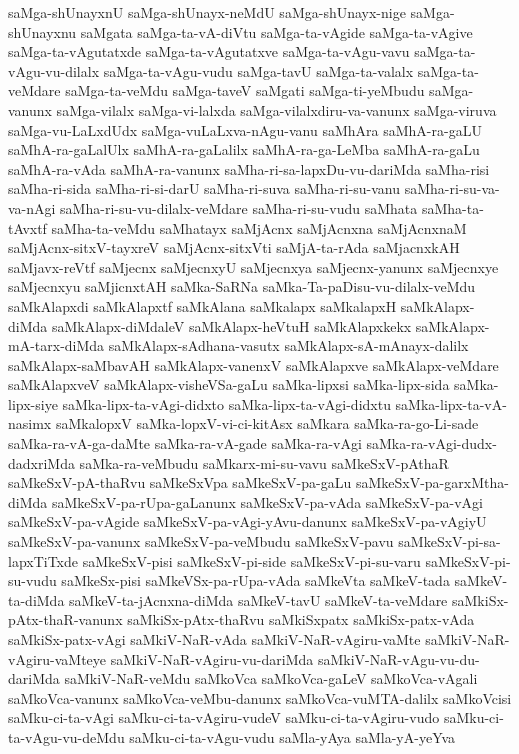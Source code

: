 {saMga-shUnayxnU
saMga-shUnayx-neMdU
saMga-shUnayx-nige
saMga-shUnayxnu
saMgata
saMga-ta-vA-diVtu
saMga-ta-vAgide
saMga-ta-vAgive
saMga-ta-vAgutatxde
saMga-ta-vAgutatxve
saMga-ta-vAgu-vavu
saMga-ta-vAgu-vu-dilalx
saMga-ta-vAgu-vudu
saMga-tavU
saMga-ta-valalx
saMga-ta-veMdare
saMga-ta-veMdu
saMga-taveV
saMgati
saMga-ti-yeMbudu
saMga-vanunx
saMga-vilalx
saMga-vi-lalxda
saMga-vilalxdiru-va-vanunx
saMga-viruva
saMga-vu-LaLxdUdx
saMga-vuLaLxva-nAgu-vanu
saMhAra
saMhA-ra-gaLU
saMhA-ra-gaLalUlx
saMhA-ra-gaLalilx
saMhA-ra-ga-LeMba
saMhA-ra-gaLu
saMhA-ra-vAda
saMhA-ra-vanunx
saMha-ri-sa-lapxDu-vu-dariMda
saMha-risi
saMha-ri-sida
saMha-ri-si-darU
saMha-ri-suva
saMha-ri-su-vanu
saMha-ri-su-va-va-nAgi
saMha-ri-su-vu-dilalx-veMdare
saMha-ri-su-vudu
saMhata
saMha-ta-tAvxtf
saMha-ta-veMdu
saMhatayx
saMjAcnx
saMjAcnxna
saMjAcnxnaM
saMjAcnx-sitxV-tayxreV
saMjAcnx-sitxVti
saMjA-ta-rAda
saMjacnxkAH
saMjavx-reVtf
saMjecnx
saMjecnxyU
saMjecnxya
saMjecnx-yanunx
saMjecnxye
saMjecnxyu
saMjicnxtAH
saMka-SaRNa
saMka-Ta-paDisu-vu-dilalx-veMdu
saMkAlapxdi
saMkAlapxtf
saMkAlana
saMkalapx
saMkalapxH
saMkAlapx-diMda
saMkAlapx-diMdaleV
saMkAlapx-heVtuH
saMkAlapxkekx
saMkAlapx-mA-tarx-diMda
saMkAlapx-sAdhana-vasutx
saMkAlapx-sA-mAnayx-dalilx
saMkAlapx-saMbavAH
saMkAlapx-vanenxV
saMkAlapxve
saMkAlapx-veMdare
saMkAlapxveV
saMkAlapx-visheVSa-gaLu
saMka-lipxsi
saMka-lipx-sida
saMka-lipx-siye
saMka-lipx-ta-vAgi-didxto
saMka-lipx-ta-vAgi-didxtu
saMka-lipx-ta-vA-nasimx
saMkalopxV
saMka-lopxV-vi-ci-kitAsx
saMkara
saMka-ra-go-Li-sade
saMka-ra-vA-ga-daMte
saMka-ra-vA-gade
saMka-ra-vAgi
saMka-ra-vAgi-dudx-dadxriMda
saMka-ra-veMbudu
saMkarx-mi-su-vavu
saMkeSxV-pAthaR
saMkeSxV-pA-thaRvu
saMkeSxVpa
saMkeSxV-pa-gaLu
saMkeSxV-pa-garxMtha-diMda
saMkeSxV-pa-rUpa-gaLanunx
saMkeSxV-pa-vAda
saMkeSxV-pa-vAgi
saMkeSxV-pa-vAgide
saMkeSxV-pa-vAgi-yAvu-danunx
saMkeSxV-pa-vAgiyU
saMkeSxV-pa-vanunx
saMkeSxV-pa-veMbudu
saMkeSxV-pavu
saMkeSxV-pi-sa-lapxTiTxde
saMkeSxV-pisi
saMkeSxV-pi-side
saMkeSxV-pi-su-varu
saMkeSxV-pi-su-vudu
saMkeSx-pisi
saMkeVSx-pa-rUpa-vAda
saMkeVta
saMkeV-tada
saMkeV-ta-diMda
saMkeV-ta-jAcnxna-diMda
saMkeV-tavU
saMkeV-ta-veMdare
saMkiSx-pAtx-thaR-vanunx
saMkiSx-pAtx-thaRvu
saMkiSxpatx
saMkiSx-patx-vAda
saMkiSx-patx-vAgi
saMkiV-NaR-vAda
saMkiV-NaR-vAgiru-vaMte
saMkiV-NaR-vAgiru-vaMteye
saMkiV-NaR-vAgiru-vu-dariMda
saMkiV-NaR-vAgu-vu-du-dariMda
saMkiV-NaR-veMdu
saMkoVca
saMkoVca-gaLeV
saMkoVca-vAgali
saMkoVca-vanunx
saMkoVca-veMbu-danunx
saMkoVca-vuMTA-dalilx
saMkoVcisi
saMku-ci-ta-vAgi
saMku-ci-ta-vAgiru-vudeV
saMku-ci-ta-vAgiru-vudo
saMku-ci-ta-vAgu-vu-deMdu
saMku-ci-ta-vAgu-vudu
saMla-yAya
saMla-yA-yeYva
}
